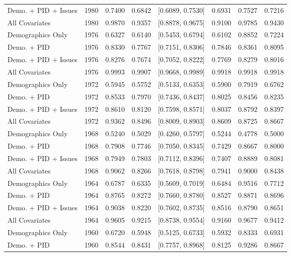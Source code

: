 \begin{longtable}{lrrrlrrr}
  Demo. + PID + Issues & 1980 & 0.7400 & 0.6842 & [0.6089, 0.7530] & 0.6931 & 0.7527 & 0.7216 \\ 
  All Covariates & 1980 & 0.9870 & 0.9357 & [0.8878, 0.9675] & 0.9100 & 0.9785 & 0.9430 \\ 
  Demographics Only & 1976 & 0.6327 & 0.6140 & [0.5453, 0.6794] & 0.6102 & 0.8852 & 0.7224 \\ 
  Demo. + PID & 1976 & 0.8330 & 0.7767 & [0.7151, 0.8306] & 0.7846 & 0.8361 & 0.8095 \\ 
  Demo. + PID + Issues & 1976 & 0.8276 & 0.7674 & [0.7052, 0.8222] & 0.7769 & 0.8279 & 0.8016 \\ 
  All Covariates & 1976 & 0.9993 & 0.9907 & [0.9668, 0.9989] & 0.9918 & 0.9918 & 0.9918 \\ 
  Demographics Only & 1972 & 0.5945 & 0.5752 & [0.5133, 0.6353] & 0.5900 & 0.7919 & 0.6762 \\ 
  Demo. + PID & 1972 & 0.8533 & 0.7970 & [0.7436, 0.8437] & 0.8025 & 0.8456 & 0.8235 \\ 
  Demo. + PID + Issues & 1972 & 0.8610 & 0.8120 & [0.7598, 0.8571] & 0.8037 & 0.8792 & 0.8397 \\ 
  All Covariates & 1972 & 0.9362 & 0.8496 & [0.8009, 0.8903] & 0.8609 & 0.8725 & 0.8667 \\ 
  Demographics Only & 1968 & 0.5240 & 0.5029 & [0.4260, 0.5797] & 0.5244 & 0.4778 & 0.5000 \\ 
  Demo. + PID & 1968 & 0.7908 & 0.7746 & [0.7050, 0.8345] & 0.7429 & 0.8667 & 0.8000 \\ 
  Demo. + PID + Issues & 1968 & 0.7949 & 0.7803 & [0.7112, 0.8396] & 0.7407 & 0.8889 & 0.8081 \\ 
  All Covariates & 1968 & 0.9062 & 0.8266 & [0.7618, 0.8798] & 0.7941 & 0.9000 & 0.8438 \\ 
  Demographics Only & 1964 & 0.6787 & 0.6335 & [0.5609, 0.7019] & 0.6484 & 0.9516 & 0.7712 \\ 
  Demo. + PID & 1964 & 0.8765 & 0.8272 & [0.7660, 0.8780] & 0.8527 & 0.8871 & 0.8696 \\ 
  Demo. + PID + Issues & 1964 & 0.9038 & 0.8220 & [0.7602, 0.8735] & 0.8516 & 0.8790 & 0.8651 \\ 
  All Covariates & 1964 & 0.9605 & 0.9215 & [0.8738, 0.9554] & 0.9160 & 0.9677 & 0.9412 \\ 
  Demographics Only & 1960 & 0.6720 & 0.5948 & [0.5125, 0.6733] & 0.5932 & 0.8333 & 0.6931 \\ 
  Demo. + PID & 1960 & 0.8544 & 0.8431 & [0.7757, 0.8968] & 0.8125 & 0.9286 & 0.8667 \\ 

\end{longtable}

